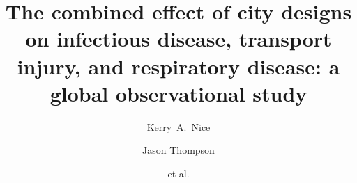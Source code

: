 \documentclass[preprint,12pt]{elsarticle}
\begin{document}
\begin{frontmatter}



\title{The combined effect of city designs on infectious disease, transport injury, and respiratory disease: a global observational study}


\author[melb]{Kerry~A.~Nice}
\author[melb]{Jason Thompson}
\author[melb]{et al.}

\address[melb]{Transport, Health, and Urban Design Research Lab, Faculty of Architecture, Building, and Planning, University of Melbourne, VIC, Australia.}




\end{frontmatter}
\end{document}
